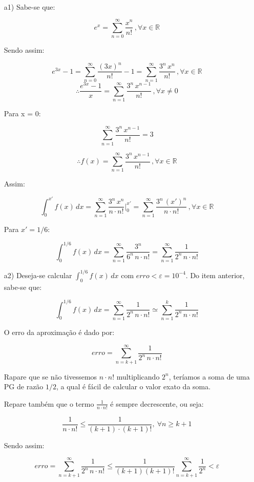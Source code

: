 \documentclass[12pt,a4paper]{article}
\begin{document}
 \\

\begin{itemize}
\item[a1)] Sabe-se que:

$$ e^x  = \sum_{n=0}^\infty \frac{x^n}{n!} \, , \forall x \in \mathbb{R}$$

Sendo assim:

$$ e^{3x} - 1 = \sum_{n=0}^\infty \frac{(3x)^n}{n!} - 1 =  \sum_{n=1}^\infty \frac{3^n \, x^n}{n!} \, , \forall x \in \mathbb{R} $$
$$ \therefore \frac{e^{3x} - 1}{x} = \sum_{n=1}^\infty \frac{3^n \, x^{n-1}}{n!} \, , \forall x \neq 0 $$

Para x = 0:

$$ \sum_{n=1}^\infty \frac{3^n \, x^{n-1}}{n!} = 3 $$

$$ \therefore f(x) = \sum_{n=1}^\infty \frac{3^n \, x^{n-1}}{n!} \, , \forall x \in \mathbb{R} $$

Assim:

$$ \int_{0}^{x'} f(x) \, dx = \sum_{n=1}^\infty \frac{3^n \, x^{n}}{n \cdot n!} \Big|_{0}^{x'} = \sum_{n=1}^\infty \frac{3^n \, (x')^{n}}{n \cdot n!} \, , \forall x \in \mathbb{R} $$

Para $ x' = 1/6$:

$$ \int_{0}^{1/6} f(x) \, dx =  \sum_{n=1}^\infty \frac{3^n}{ 6^n \, n \cdot n!} = \sum_{n=1}^\infty \frac{1}{ 2^n \, n \cdot n!} $$

\item[a2)] Deseja-se calcular $ \displaystyle\int_{0}^{1/6} f(x) \, dx$ com $erro < \varepsilon = 10^{-4}$. Do item anterior, sabe-se que:

$$ \int_{0}^{1/6} f(x) \, dx = \sum_{n=1}^\infty \frac{1}{ 2^n \, n \cdot n!} \simeq \sum_{n=1}^k \frac{1}{ 2^n \, n \cdot n!}  $$

O erro da aproximação é dado por:

$$ erro = \sum_{n=k+1}^\infty \frac{1}{ 2^n \, n \cdot n!} $$

Rapare que se não tivessemos $ n \cdot n!$ multiplicando $2^n$, teríamos a soma de uma PG de razão $1/2$, a qual é fácil de calcular o valor exato da soma.

Repare também que o termo $ \frac{1}{n \cdot n!} $ é sempre decrescente, ou seja:

$$ \frac{1}{n \cdot n!} \leq \frac{1}{ (k+1) \cdot (k+1)!} ,\ \forall n \geq k+1 $$

Sendo assim:

$$ erro = \sum_{n=k+1}^\infty \frac{1}{ 2^n \, n \cdot n!} \leq \frac{1}{(k+1)(k+1)!} \sum_{n=k+1}^\infty \frac{1}{ 2^n} < \varepsilon $$


\end{itemize}
\end{document}
